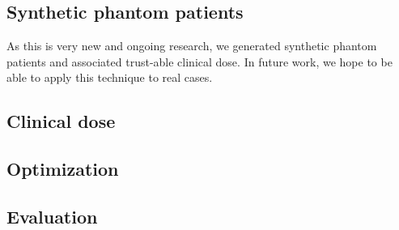 \subsection*{Synthetic phantom patients}
As this is very new and ongoing research, we generated synthetic phantom patients and associated trust-able clinical dose.
In future work, we hope to be able to apply this technique to real cases.

\subsection*{Clinical dose}

\subsection*{Optimization}

\subsection*{Evaluation}
